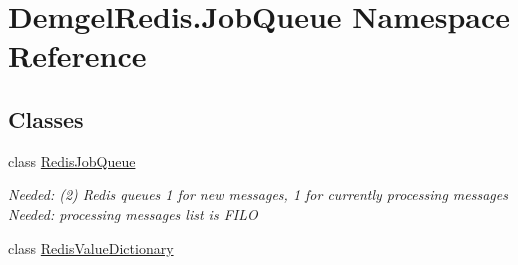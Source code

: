 \hypertarget{namespace_demgel_redis_1_1_job_queue}{}\section{Demgel\+Redis.\+Job\+Queue Namespace Reference}
\label{namespace_demgel_redis_1_1_job_queue}
\subsection*{Classes}
\begin{DoxyCompactItemize}
\item 
class \hyperlink{class_demgel_redis_1_1_job_queue_1_1_redis_job_queue}{Redis\+Job\+Queue}
\begin{DoxyCompactList}\small\item\em Needed\+: (2) Redis queues 1 for new messages, 1 for currently processing messages Needed\+: processing messages list is F\+I\+L\+O \end{DoxyCompactList}\item 
class \hyperlink{class_demgel_redis_1_1_job_queue_1_1_redis_value_dictionary}{Redis\+Value\+Dictionary}
\end{DoxyCompactItemize}
